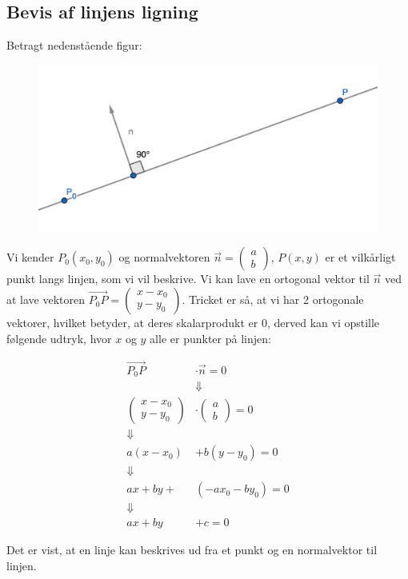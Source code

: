 \documentclass{article}
\makeatletter
\newenvironment{proofw}{\par
  \pushQED{\qed}%
  \normalfont \topsep6\p@\@plus6\p@\relax
  \trivlist
  \item[]\ignorespaces
}{%
  \popQED\endtrivlist\@endpefalse
}
\makeatother
\begin{document}
\subsection{Bevis af linjens ligning}

\begin{proofw}
    Betragt nedenstående figur:
    \begin{figure}[h]
        \centering
        \includegraphics[scale=0.4]{skitser/linjens_ligning.png}
    \end{figure}

    Vi kender $P_0(x_0,y_0)$ og normalvektoren $\vec{n}=\begin{pmatrix}
        a \\ b
    \end{pmatrix}$, $P(x,y)$ er et vilkårligt punkt langs linjen, som vi vil beskrive.
    Vi kan lave en ortogonal vektor til $\vec{n}$ ved at lave vektoren $\vec{P_0P}=\begin{pmatrix}
        x-x_0
        \\
        y-y_0
    \end{pmatrix}$.
    Tricket er så, at vi har 2 ortogonale vektorer, hvilket betyder,
    at deres skalarprodukt er 0, derved kan vi opstille følgende udtryk, hvor $x$ og $y$ alle er punkter på linjen:

    \begin{align*}
        \vec{P_0P}&\cdot\vec{n}=0
        \\
        &\Downarrow
        \\
        \begin{pmatrix}
            x-x_0
            \\
            y-y_0
        \end{pmatrix}
        &\cdot
        \begin{pmatrix}
            a \\
            b
        \end{pmatrix}=0
        \\
        \Downarrow
        \\
        a(x-x_0)&+b(y-y_0)=0
        \\
        \Downarrow
        \\
        ax+by+&(-ax_0-by_0)=0
        \\
        \Downarrow
        \\
        ax+by&+c=0
    \end{align*}

    Det er vist, at en linje kan beskrives ud fra et punkt og en normalvektor til linjen.

\end{proofw}
\end{document}
